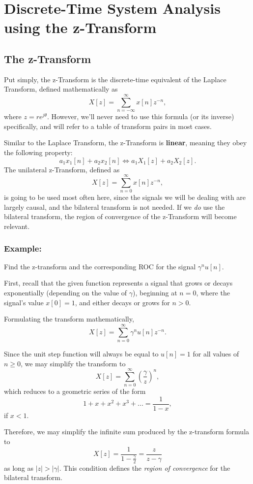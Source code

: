 \documentclass{article}
\begin{document}
\setcounter{section}{4}
\section{Discrete-Time System Analysis using the z-Transform} 
\setcounter{subsection}{0}
\subsection{The z-Transform}
Put simply, the z-Transform is the discrete-time equivalent of the Laplace Transform, defined mathematically as
\[
	X[z] = \sum_{n=-\infty}^{\infty}x[n]z^{-n},
\]
where \(z = re^{j\theta}\). However, we'll never need to use this formula (or its inverse) specifically, and will refer to a table of transform pairs in most cases.

Similar to the Laplace Transform, the z-Transform is \textbf{linear}, meaning they obey the following property:
\[
	a_1x_1[n] + a_2x_2[n] \Leftrightarrow a_1X_1[z] + a_2X_2[z].
\]
The unilateral z-Transform, defined as
\[
	X[z] = \sum_{n=0}^{\infty}x[n]z^{-n},
\]
is going to be used most often here, since the signals we will be dealing with are largely causal, and the bilateral transform is not needed. If we \textit{do} use the bilateral transform, the region of convergence of the z-Transform will become relevant.

\subsubsection{Example:}

Find the z-transform and the corresponding ROC for the signal \(\gamma^nu[n]\). 

First, recall that the given function represents a signal that grows or decays exponentially (depending on the value of \(\gamma\)), beginning at \(n=0\), where the signal's value \(x[0] = 1\), and either decays or grows for \(n>0\).

Formulating the transform mathematically, 
\[
	X[z] = \sum_{n=0}^{\infty}\gamma^nu[n]z^{-n}.
\]

Since the unit step function will always be equal to \(u[n] = 1\) for all values of \(n \geq 0\), we may simplify the transform to 
\[
	X[z] = \sum_{n=0}^{\infty}\left(\frac{\gamma}{z}\right)^n,
\]
which reduces to a geometric series of the form 
\[
  1 + x + x^2 + x^3 + ... = \frac{1}{1-x},
\]
if \(x < 1\).

Therefore, we may simplify the infinite sum produced by the z-transform formula to
\[
	X[z] = \frac{1}{1-\frac{\gamma}{2}} = \frac{z}{z-\gamma}
\]
as long as \(|z| > |\gamma|\). This condition defines the \textit{region of convergence} for the bilateral transform.
\end{document}
